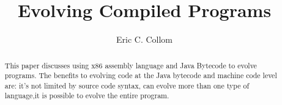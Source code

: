 \documentclass{sig-alternate}
\begin{document}
%

\title{
Evolving Compiled Programs
}
%
%
%
%

%
\author{
%
%
\alignauthor
Eric C. Collom
}

\maketitle
\begin{abstract}
This paper discusses using x86 assembly language and Java Bytecode to evolve programs. The benefits to evolving code at the Java bytecode and machine code level are: it's not limited by source code syntax, can evolve more than one type of language,it is possible to evolve the entire program. 
\end{abstract}
\end{document}
